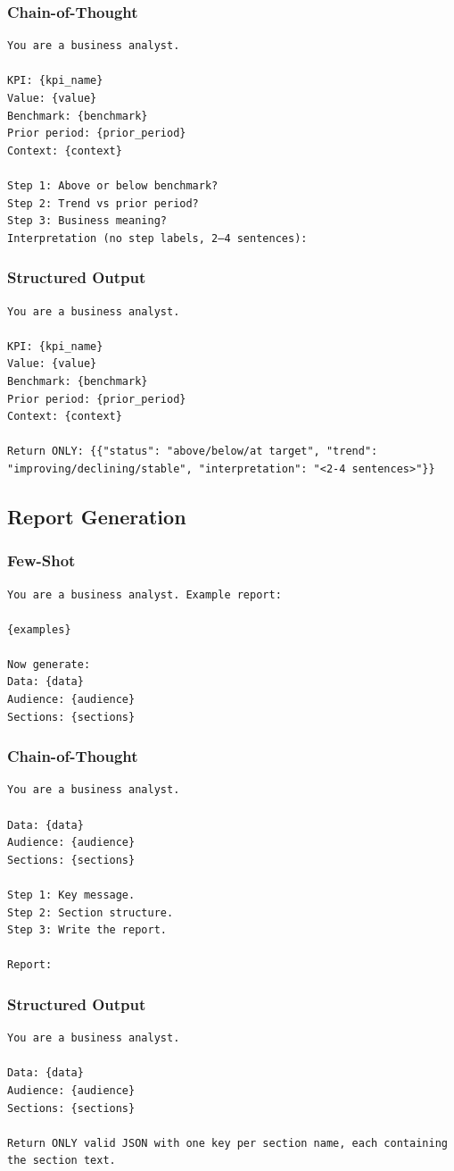 \subsubsection{Chain-of-Thought}
\begin{verbatim}
You are a business analyst.

KPI: {kpi_name}
Value: {value}
Benchmark: {benchmark}
Prior period: {prior_period}
Context: {context}

Step 1: Above or below benchmark?
Step 2: Trend vs prior period?
Step 3: Business meaning?
Interpretation (no step labels, 2–4 sentences):
\end{verbatim}

\subsubsection{Structured Output}
\begin{verbatim}
You are a business analyst.

KPI: {kpi_name}
Value: {value}
Benchmark: {benchmark}
Prior period: {prior_period}
Context: {context}

Return ONLY: {{"status": "above/below/at target", "trend": "improving/declining/stable", "interpretation": "<2-4 sentences>"}}
\end{verbatim}

\subsection{Report Generation}
\subsubsection{Few-Shot}
\begin{verbatim}
You are a business analyst. Example report:

{examples}

Now generate:
Data: {data}
Audience: {audience}
Sections: {sections}
\end{verbatim}

\subsubsection{Chain-of-Thought}
\begin{verbatim}
You are a business analyst.

Data: {data}
Audience: {audience}
Sections: {sections}

Step 1: Key message.
Step 2: Section structure.
Step 3: Write the report.

Report:
\end{verbatim}

\subsubsection{Structured Output}
\begin{verbatim}
You are a business analyst.

Data: {data}
Audience: {audience}
Sections: {sections}

Return ONLY valid JSON with one key per section name, each containing the section text.
\end{verbatim}

